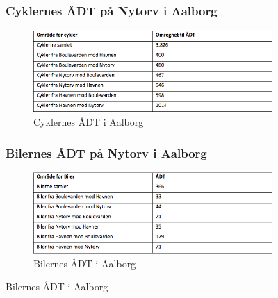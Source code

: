 \begin{figure}[htbp]
\subsubsection{Cyklernes ÅDT på Nytorv i Aalborg}
\begin{figure}[htbp]
   \centering
   \begin{adjustbox}{max width=\textwidth}
     \includegraphics[scale=0.8]{figures/Billederogfigur/cykleradt.jpg}
  \end{adjustbox}
   \caption{Cyklernes ÅDT i Aalborg}
   \label{fig:cykleradt}
 \end{figure}

 \subsubsection{Bilernes ÅDT på Nytorv i Aalborg}
 \begin{figure}[htbp]
   \centering
   \begin{adjustbox}{max width=\textwidth}
     \includegraphics[scale=0.6]{figures/Billederogfigur/bileradt.jpg}
  \end{adjustbox}
   \caption{Bilernes ÅDT i Aalborg}
   \label{fig:bileradt}
 \end{figure}


\end{figure}
